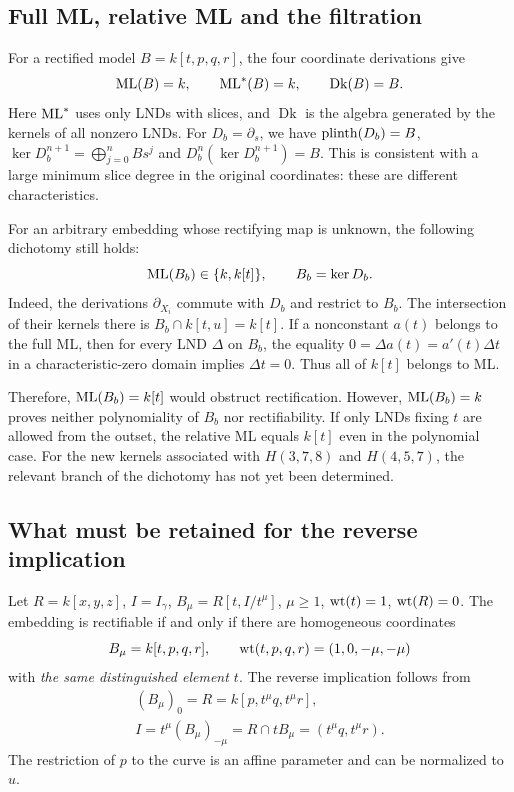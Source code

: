 \subsection{Full ML, relative ML and the filtration}
For a rectified model $B=k[t,p,q,r]$, the four coordinate
derivations give
\[
\operatorname{ML}(B)=k,\qquad \operatorname{ML}^*(B)=k,\qquad \operatorname{Dk}(B)=B.
\]
Here $\operatorname{ML}^*$ uses only LNDs with slices, and $\operatorname{Dk}$
is the algebra generated by the kernels of all nonzero LNDs.
For $D_b=\partial_s$, we have $\operatorname{plinth}(D_b)=B$,
$\ker D_b^{n+1}=\bigoplus_{j=0}^n Bs^j$ and
$D_b^n(\ker D_b^{n+1})=B$.
This is consistent with a large minimum slice degree in the original
coordinates: these are different characteristics.

For an arbitrary embedding whose rectifying map is unknown, the following
dichotomy still holds:
\[
\operatorname{ML}(B_b)\in\{k,k[t]\},\qquad B_b=\ker D_b.
\]
Indeed, the derivations $\partial_{X_i}$ commute with $D_b$ and restrict
to $B_b$. The intersection of their kernels there is
$B_b\cap k[t,u]=k[t]$. If a nonconstant $a(t)$ belongs to the full ML,
then for every LND $\Delta$ on $B_b$, the equality
$0=\Delta a(t)=a'(t)\Delta t$ in a characteristic-zero domain
implies $\Delta t=0$. Thus all of $k[t]$ belongs to ML.

Therefore, $\operatorname{ML}(B_b)=k[t]$ would obstruct rectification.
However, $\operatorname{ML}(B_b)=k$ proves neither polynomiality of $B_b$
nor rectifiability. If only LNDs fixing $t$ are allowed from the outset,
the relative ML equals $k[t]$ even in the polynomial case.
For the new kernels associated with $H(3,7,8)$ and $H(4,5,7)$,
the relevant branch of the dichotomy has not yet been determined.

\subsection{What must be retained for the reverse implication}
Let $R=k[x,y,z]$, $I=I_\gamma$,
$B_\mu=R[t,I/t^\mu]$, $\mu\ge1$, $\operatorname{wt}(t)=1$, $\operatorname{wt}(R)=0$.
The embedding is rectifiable if and only if there are homogeneous
coordinates
\[
B_\mu=k[t,p,q,r],\qquad
\operatorname{wt}(t,p,q,r)=(1,0,-\mu,-\mu)
\]
with \emph{the same distinguished element $t$}. The reverse implication
follows from
\[
\begin{gathered}
(B_\mu)_0=R=k[p,t^\mu q,t^\mu r],\\
I=t^\mu(B_\mu)_{-\mu}=R\cap tB_\mu=(t^\mu q,t^\mu r).
\end{gathered}
\]
The restriction of $p$ to the curve is an affine parameter and can
be normalized to $u$.


